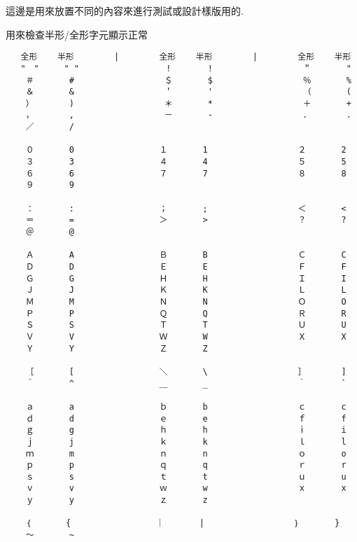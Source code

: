 %
%
%

這邊是用來放置不同的內容來進行測試或設計樣版用的.


用來檢查半形/全形字元顯示正常\\

\begin{verbatim}
   全形    半形        |        全形    半形        |        全形    半形
   "　"     " "                 ！       !                  ＂       "
    ＃       #                  ＄       $                  ％       %
    ＆       &                  ＇       '                  （       (
    ）       )                  ＊       *                  ＋       +
    ，       ,                  －       -                  ．       .
    ／       /

    ０       0                 １       1                  ２       2
    ３       3                 ４       4                  ５       5
    ６       6                 ７       7                  ８       8
    ９       9

    ：       :                 ；       ;                  ＜       <
    ＝       =                 ＞       >                  ？       ?
    ＠       @

    Ａ       A                 Ｂ       B                  Ｃ       C
    Ｄ       D                 Ｅ       E                  Ｆ       F
    Ｇ       G                 Ｈ       H                  Ｉ       I
    Ｊ       J                 Ｋ       K                  Ｌ       L
    Ｍ       M                 Ｎ       N                  Ｏ       O
    Ｐ       P                 Ｑ       Q                  Ｒ       R
    Ｓ       S                 Ｔ       T                  Ｕ       U
    Ｖ       V                 Ｗ       W                  Ｘ       X
    Ｙ       Y                 Ｚ       Z

    ［       [                 ＼       \                  ］       ]
    ＾       ^                 ＿       _                  ｀       `

    ａ       a                 ｂ       b                  ｃ       c
    ｄ       d                 ｅ       e                  ｆ       f
    ｇ       g                 ｈ       h                  ｉ       i
    ｊ       j                 ｋ       k                  ｌ       l
    ｍ       m                 ｎ       n                  ｏ       o
    ｐ       p                 ｑ       q                  ｒ       r
    ｓ       s                 ｔ       t                  ｕ       u
    ｖ       v                 ｗ       w                  ｘ       x
    ｙ       y                 ｚ       z

    ｛       {                 ｜       |                  ｝       }
    ～       ~
\end{verbatim}


